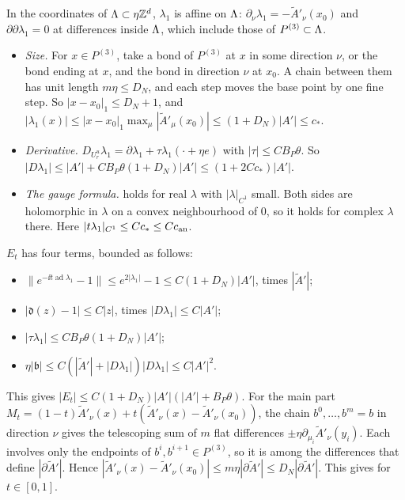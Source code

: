 \begin{detail}
\begin{step}
In the coordinates of $\Lambda\subset\eta\mathbb Z^d$, $\lambda_1$ is affine on $\Lambda$: $\partial_\nu\lambda_1=-\tilde A'_\nu(x_0)$ and $\partial\partial\lambda_1=0$ at differences inside $\Lambda$, which include those of $P^{(3)}\subset\Lambda$.
\begin{itemize}
\item \emph{Size.} For $x\in P^{(3)}$, take a bond of $P^{(3)}$ at $x$ in some direction $\nu$, or the bond ending at $x$, and the bond in direction $\nu$ at $x_0$. A chain between them has unit length $m\eta\le D_N$, and each step moves the base point by one fine step. So $|x-x_0|_1\le D_N+1$, and $|\lambda_1(x)|\le|x-x_0|_1\max_\mu|\tilde A'_\mu(x_0)|\le(1+D_N)|A'|\le c_*$.
\item \emph{Derivative.} $D_{U_r^u}\lambda_1=\partial\lambda_1+\tau\lambda_1(\cdot+\eta e)$ with $|\tau|\le CB_P\theta$. So $|D\lambda_1|\le|A'|+CB_P\theta(1+D_N)|A'|\le(1+2Cc_*)|A'|$.
\item \emph{The gauge formula.}  holds for real $\lambda$ with $|\lambda|_{C^1}$ small. Both sides are holomorphic in $\lambda$ on a convex neighbourhood of $0$, so it holds for complex $\lambda$ there. Here $|t\lambda_1|_{C^1}\le Cc_*\le Cc_{\rm an}$.
\end{itemize}
\end{step}

\begin{step}
$E_t$ has four terms, bounded as follows:
\begin{itemize}
\item $\|e^{-\ii t\operatorname{ad}\lambda_1}-1\|\le e^{2|\lambda_1|}-1\le C(1+D_N)|A'|$, times $|\tilde A'|$;
\item $|\mathfrak d(z)-1|\le C|z|$, times $|D\lambda_1|\le C|A'|$;
\item $|\tau\lambda_1|\le CB_P\theta(1+D_N)|A'|$;
\item $\eta|\mathfrak b|\le C(|\tilde A'|+|D\lambda_1|)|D\lambda_1|\le C|A'|^2$.
\end{itemize}
This gives $|E_t|\le C(1+D_N)|A'|(|A'|+B_P\theta)$. For the main part $M_t=(1-t)\tilde A'_\nu(x)+t(\tilde A'_\nu(x)-\tilde A'_\nu(x_0))$, the chain $b^0,\dots,b^m=b$ in direction $\nu$ gives the telescoping sum of $m$ flat differences $\pm\eta\partial_{\mu_i}\tilde A'_\nu(y_i)$. Each involves only the endpoints of $b^i,b^{i+1}\in P^{(3)}$, so it is among the differences that define $|\partial\tilde A'|$. Hence $|\tilde A'_\nu(x)-\tilde A'_\nu(x_0)|\le m\eta|\partial\tilde A'|\le D_N|\partial\tilde A'|$. This gives  for $t\in[0,1]$.
\end{step}


\end{detail}
